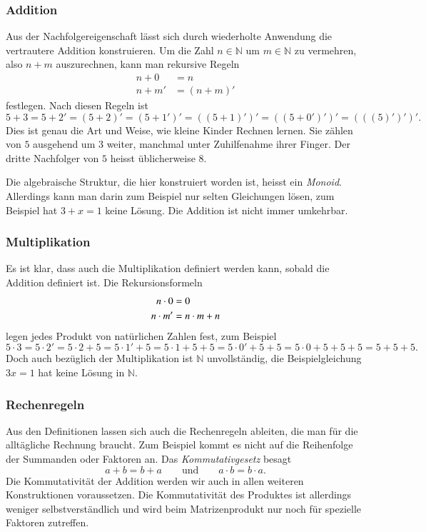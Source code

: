 \subsubsection{Addition}
Aus der Nachfolgereigenschaft lässt sich durch wiederholte Anwendung
die vertrautere Addition konstruieren.
%
Um die Zahl $n\in\mathbb{N}$ um $m\in\mathbb{N}$ zu vermehren, also
$n+m$ auszurechnen, kann man rekursive Regeln
\begin{align*}
n+0&=n\\
n+m'&=(n+m)'
\end{align*}
festlegen.
Nach diesen Regeln ist
\[
5+3
=
5+2'
=
(5+2)'
=
(5+1')'
=
((5+1)')'
=
((5+0')')'
=
(((5)')')'.
\]
Dies ist genau die Art und Weise, wie kleine Kinder Rechnen lernen.
Sie zählen von $5$ ausgehend um $3$ weiter, manchmal unter Zuhilfenahme
ihrer Finger.
Der dritte Nachfolger von $5$ heisst üblicherweise $8$.

Die algebraische Struktur, die hier konstruiert worden ist, heisst
ein {\em Monoid}.
%
Allerdings kann man darin zum Beispiel nur selten Gleichungen
lösen, zum Beispiel hat $3+x=1$ keine Lösung.
Die Addition ist nicht immer umkehrbar.

\subsubsection{Multiplikation}
Es ist klar, dass auch die Multiplikation definiert werden kann, 
sobald die Addition definiert ist.
Die Rekursionsformeln
\begin{align}
n\cdot 0 &= 0 \notag \\
n\cdot m' &= n\cdot m + n
\label{buch:zahlen:multiplikation-rekursion}
\end{align}
legen jedes Produkt von natürlichen Zahlen fest, zum Beispiel
\[
5\cdot 3
=
5\cdot 2'
=
5\cdot 2 + 5
=
5\cdot 1' + 5
=
5\cdot 1 + 5 + 5
=
5\cdot 0' + 5 + 5
=
5\cdot 0 + 5 + 5 + 5
=
5 + 5 + 5.
\]
Doch auch bezüglich der Multiplikation ist $\mathbb{N}$ unvollständig,
die Beispielgleichung $3x=1$ hat keine Lösung in $\mathbb{N}$.

\subsubsection{Rechenregeln}
Aus den Definitionen lassen sich auch die Rechenregeln ableiten,
die man für die alltägliche Rechnung braucht.
Zum Beispiel kommt es nicht auf die Reihenfolge der Summanden
oder Faktoren an. 
Das {\em Kommutativgesetz} besagt
\[
a+b=b+a
\qquad\text{und}\qquad
a\cdot b = b\cdot a.
\]
%
Die Kommutativität der Addition werden wir auch in allen weiteren
Konstruktionen voraussetzen.
Die Kommutativität des Produktes ist allerdings weniger selbstverständlich
und wird beim Matrizenprodukt nur noch für spezielle Faktoren zutreffen.

